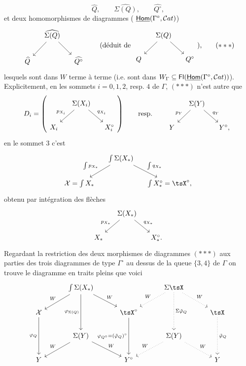 \[
\widehat{Q}, \qquad \widehat{\Sigma(Q)}, \qquad \widehat{Q^\circ},
\]
et deux homomorphismes de diagrammes ( $\underline{\mathsf{Hom}}(\Gamma^\circ,\mathcal{C}at)$)
\[
\begin{tikzcd}[column sep=small]
 & \widehat{\Sigma(Q)} \arrow[dl] \arrow[dr] & \\
\widehat{Q} & & \widehat{Q^\circ}
\end{tikzcd}
\qquad
\text{(déduit de }
\begin{tikzcd}[column sep=small]
 & \Sigma(Q) \arrow[dl] \arrow[dr] & \\
Q & & Q^\circ
\end{tikzcd}
\text{),}
\tag*{$(***)$}
\]
lesquels sont dans $W$ terme à terme (i.e. sont dans $W_\Gamma\subseteq\mathsf{Fl}(\underline{\mathsf{Hom}}(\Gamma^\circ,\mathcal{C}at))$). Explicitement, en les sommets $i=0,1,2$, resp. $4$ de $\Gamma$, $(***)$ n'est autre que
\[
D_i =
\left(
\begin{tikzcd}[column sep=small]
 & \Sigma(X_i) \arrow[dl, "p_{X_i}"'] \arrow[dr, "q_{X_i}"] & \\
X_i & & X_i^\circ
\end{tikzcd}
\right)
\qquad \text{resp.} \qquad
\begin{tikzcd}[column sep=small]
 & \Sigma(Y) \arrow[dl, "p_Y"'] \arrow[dr, "q_Y"] & \\
Y & & Y^\circ,
\end{tikzcd}
\]
en le sommet 3 c'est
\[
\begin{tikzcd}[column sep=small]
 & \int\Sigma(X_*) \arrow[dl, "\int p_{X_*}"'] \arrow[dr, "\int q_{X_*}"] & \\
\sX=\int X_* & & \int X_*^\circ=\tsX^\circ,
\end{tikzcd}
\]
obtenu par intégration des flèches
\[
\begin{tikzcd}[column sep=small]
 & \Sigma(X_*) \arrow[dl, "p_{X_*}"'] \arrow[dr, "q_{X_*}"] & \\
X_* & & X_*^\circ.
\end{tikzcd}
\]
Regardant la restriction des deux morphismes de diagrammes $(***)$ aux parties des trois diagrammes de type $\Gamma^\circ$ au dessus de la queue $\{3,4\}$ de $\Gamma$ on trouve le diagramme en traits pleins que voici
\[
\begin{tikzcd}[column sep=3em, row sep=normal]
 & \int\Sigma(X_*) \arrow[dl, "W"'] \arrow[dr, "W"] \arrow[dd, "\varphi_{\Sigma(Q)}"'] & & \Sigma\tsX \arrow[dl, dotted, "W"'] \arrow[dr, dotted, "W"] \arrow[dd, dotted, "\Sigma\tilde{\varphi}_Q"] & \\
\sX \arrow[dd, "\varphi_Q"'] & & \tsX^\circ \arrow[dd, "\varphi_{Q^\circ}=(\tilde{\varphi}_Q)^\circ"'] & & \tsX \arrow[dd, dotted, "\tilde{\varphi}_Q"] \\
 & \Sigma(Y) \arrow[dl, "W"'] \arrow[dr, "W"] & & \Sigma(Y) \arrow[dl, dotted, "W"'] \arrow[dr, dotted, "W"] & \\
Y & & Y^\circ & & Y
\end{tikzcd}
\]
